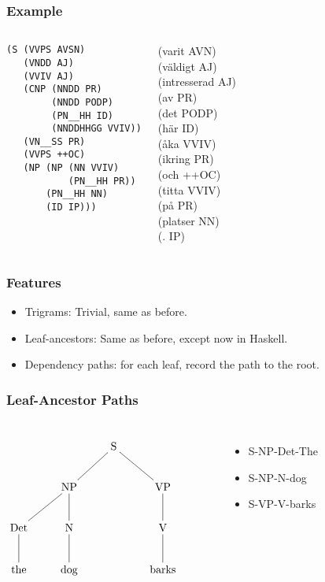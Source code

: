 \documentclass{beamer}
\begin{document}
\begin{frame}[fragile]
  \frametitle{Example}
\begin{columns}
\begin{verbatim}
(S (VVPS AVSN)
   (VNDD AJ)
   (VVIV AJ)
   (CNP (NNDD PR)
        (NNDD PODP)
        (PN__HH ID)
        (NNDDHHGG VVIV))
   (VN__SS PR)
   (VVPS ++OC)
   (NP (NP (NN VVIV)
           (PN__HH PR))
       (PN__HH NN)
       (ID IP)))
\end{verbatim}
(varit AVN) \\
(v\"a{}ldigt AJ) \\
(intresserad AJ) \\
(av PR) \\
(det PODP) \\
(h\"ar ID) \\
(\aa{}ka VVIV) \\
(ikring PR) \\
(och ++OC) \\
(titta VVIV) \\
(p\aa{} PR) \\
(platser NN)\\
(. IP)
\end{columns}
\end{frame}
\begin{frame}
  \frametitle{Features}
  \begin{itemize}
  \item Trigrams: Trivial, same as before.
  \item Leaf-ancestors: Same as before, except now in Haskell.
  \item Dependency paths: for each leaf, record the path to the root.
 \end{itemize}
\end{frame}
\begin{frame}
  \frametitle{Leaf-Ancestor Paths}

\begin{columns}
\[\xymatrix{
  &&\textrm{S} \ar@{-}[dl] \ar@{-}[dr] &&\\
  &\textrm{NP} \ar@{-}[d] \ar@{-}[dl] &&\textrm{VP} \ar@{-}[d]\\
  \textrm{Det} \ar@{-}[d] & \textrm{N} \ar@{-}[d] && \textrm{V} \ar@{-}[d] \\
\textrm{the}& \textrm{dog} && \textrm{barks}\\}
\]
\begin{itemize}
\item S-NP-Det-The
\item S-NP-N-dog
\item S-VP-V-barks
\end{itemize}
\end{columns}

\end{frame}
\end{document}
